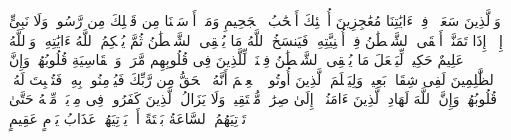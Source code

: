 \stopbuffer%
\startbuffer[\q:22:51]
وَٱلَّذِینَ سَعَوۡا۟ فِیۤ ءَایَٰتِنَا مُعَٰجِزِینَ أُو۟لَٰۤئِكَ أَصۡحَٰبُ ٱلۡجَحِیمِ%
\stopbuffer%
\startbuffer[\q:22:52]
وَمَاۤ أَرۡسَلۡنَا مِن قَبۡلِكَ مِن رَّسُولࣲ وَلَا نَبِیٍّ إِلَّاۤ إِذَا تَمَنَّىٰۤ أَلۡقَى ٱلشَّیۡطَٰنُ فِیۤ أُمۡنِیَّتِهِۦ فَیَنسَخُ ٱللَّهُ مَا یُلۡقِی ٱلشَّیۡطَٰنُ ثُمَّ یُحۡكِمُ ٱللَّهُ ءَایَٰتِهِۦۗ وَٱللَّهُ عَلِیمٌ حَكِیمࣱ%
\stopbuffer%
\startbuffer[\q:22:53]
لِّیَجۡعَلَ مَا یُلۡقِی ٱلشَّیۡطَٰنُ فِتۡنَةࣰ لِّلَّذِینَ فِی قُلُوبِهِم مَّرَضࣱ وَٱلۡقَاسِیَةِ قُلُوبُهُمۡۗ وَإِنَّ ٱلظَّٰلِمِینَ لَفِی شِقَاقِۭ بَعِیدࣲ%
\stopbuffer%
\startbuffer[\q:22:54]
وَلِیَعۡلَمَ ٱلَّذِینَ أُوتُوا۟ ٱلۡعِلۡمَ أَنَّهُ ٱلۡحَقُّ مِن رَّبِّكَ فَیُؤۡمِنُوا۟ بِهِۦ فَتُخۡبِتَ لَهُۥ قُلُوبُهُمۡۗ وَإِنَّ ٱللَّهَ لَهَادِ ٱلَّذِینَ ءَامَنُوۤا۟ إِلَىٰ صِرَٰطࣲ مُّسۡتَقِیمࣲ%
\stopbuffer%
\startbuffer[\q:22:55]
وَلَا یَزَالُ ٱلَّذِینَ كَفَرُوا۟ فِی مِرۡیَةࣲ مِّنۡهُ حَتَّىٰ تَأۡتِیَهُمُ ٱلسَّاعَةُ بَغۡتَةً أَوۡ یَأۡتِیَهُمۡ عَذَابُ یَوۡمٍ عَقِیمٍ%
\stopbuffer%
